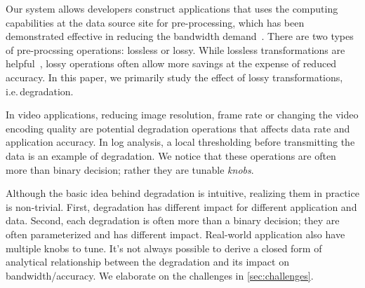 Our system allows developers construct applications that uses the computing
capabilities at the data source site for pre-processing, which has been
demonstrated effective in reducing the bandwidth demand~\cite{pu2015low,
  viswanathan2016clarinet}. There are two types of pre-procssing operations:
lossless or lossy. While lossless transformations are
helpful~\cite{rabkin2014aggregation}, lossy operations often allow more savings
at the expense of reduced accuracy. In this paper, we primarily study the effect
of lossy transformations, i.e.\,degradation.

In video applications, reducing image resolution, frame rate or changing the
video encoding quality are potential degradation operations that affects data
rate and application accuracy. In log analysis, a local thresholding before
transmitting the data is an example of degradation. We notice that these
operations are often more than binary decision; rather they are tunable
\textit{knobs}.

Although the basic idea behind degradation is intuitive, realizing them in
practice is non-trivial. First, degradation has different impact for different
application and data. Second, each degradation is often more than a binary
decision; they are often parameterized and has different impact. Real-world
application also have multiple knobs to tune. It's not always possible to derive
a closed form of analytical relationship between the degradation and its impact
on bandwidth/accuracy. We elaborate on the challenges in
\autoref{sec:challenges}.



